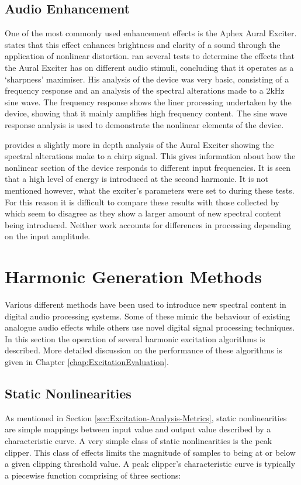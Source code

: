 	\subsection{Audio Enhancement}
	\label{sec:Excitation-Uses-Enhancement}
		One of the most commonly used enhancement effects is the Aphex Aural Exciter. \citet{shekar2013modeling}
		states that this effect enhances brightness and clarity of a sound through the application of nonlinear
		distortion. \citet{chalupper2000aural} ran several tests to determine the effects that the Aural Exciter has
		on different audio stimuli, concluding that it operates as a `sharpness' maximiser. His analysis of the
		device was very basic, consisting of a frequency response and an analysis of the spectral alterations made
		to a 2kHz sine wave. The frequency response shows the liner processing undertaken by the device, showing
		that it mainly amplifies high frequency content. The sine wave response analysis is used to demonstrate the
		nonlinear elements of the device. 

		\citet{dutilleux2011nonlinear} provides a slightly more in depth analysis of the Aural Exciter showing the
		spectral alterations make to a chirp signal. This gives information about how the nonlinear section of the
		device responds to different input frequencies. It is seen that a high level of energy is introduced at the
		second harmonic. It is not mentioned however, what the exciter's parameters were set to during these tests.
		For this reason it is difficult to compare these results with those collected by \citet{chalupper2000aural}
		which seem to disagree as they show a larger amount of new spectral content being introduced. Neither work
		accounts for differences in processing depending on the input amplitude.

\section{Harmonic Generation Methods}
\label{sec:Excitation-Methods}
	Various different methods have been used to introduce new spectral content in digital audio processing systems. Some
	of these mimic the behaviour of existing analogue audio effects while others use novel digital signal processing
	techniques. In this section the operation of several harmonic excitation algorithms is described. More detailed
	discussion on the performance of these algorithms is given in Chapter \ref{chap:ExcitationEvaluation}.

	\subsection{Static Nonlinearities}
	\label{sec:Excitation-Methods-Statics}
		As mentioned in Section \ref{sec:Excitation-Analysis-Metrics}, static nonlinearities are simple mappings
		between input value and output value described by a characteristic curve. A very simple class of static
		nonlinearities is the peak clipper. This class of effects limits the magnitude of samples to being at or
		below a given clipping threshold value. A peak clipper's characteristic curve is typically a piecewise
		function comprising of three sections:

